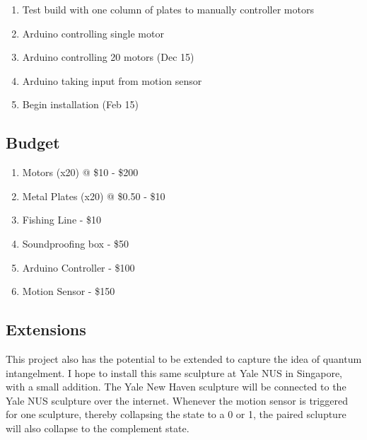 \begin{enumerate}
\item Test build with one column of plates to manually controller motors
\item Arduino controlling single motor
\item Arduino controlling 20 motors (Dec 15)
\item Arduino taking input from motion sensor
\item Begin installation (Feb 15)
\end{enumerate}

\subsection{Budget}

\begin{enumerate}
\item Motors (x20) @ \$10 - \$200
\item Metal Plates (x20) @ \$0.50 - \$10
\item Fishing Line - \$10
\item Soundproofing box - \$50
\item Arduino Controller - \$100
\item Motion Sensor - \$150
\end{enumerate}

\subsection{Extensions}

This project also has the potential to be extended to capture the idea of quantum intangelment.
I hope to install this same sculpture at Yale NUS in Singapore, with a small addition.
The Yale New Haven sculpture will be connected to the Yale NUS sculpture over the internet.
Whenever the motion sensor is triggered for one sculpture, thereby collapsing the state to a 0 or 1, the paired sclupture will also collapse to the complement state.


